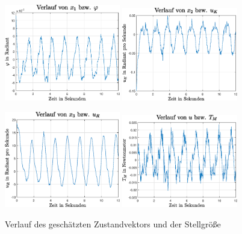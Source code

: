 \begin{figure}[!ht]
\centering
\includegraphics[width=0.45\textwidth]{img/edge_exp3_phi.eps}\hspace{0.7cm}
\includegraphics[width=0.45\textwidth]{img/edge_exp3_uk.eps}
\vspace{0.5cm}

\includegraphics[width=0.45\textwidth]{img/edge_exp3_ur.eps}\hspace{0.7cm}
\includegraphics[width=0.45\textwidth]{img/edge_exp3_tm.eps}
\label{plots_phiobs}
\caption{Verlauf des geschätzten Zustandvektors und der Stellgröße}
\end{figure}

